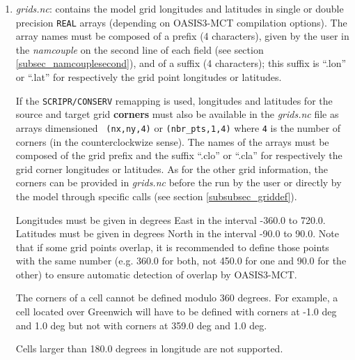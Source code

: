 \begin{enumerate}

\item {\em grids.nc}: contains the model grid
  longitudes and latitudes in single or double
  precision {\tt REAL} arrays (depending on OASIS3-MCT compilation
  options). The array names must be composed of a prefix (4
  characters), given by the user in the {\it namcouple} on the second
  line of each field (see section \ref{subsec_namcouplesecond}), and
  of a suffix (4 characters); this suffix is ``.lon'' or ``.lat'' for
  respectively the grid point longitudes or latitudes.

  If the {\tt SCRIPR/CONSERV} remapping is used, longitudes and
  latitudes for the source and target grid {\bf corners} must also be
  available in the {\em grids.nc} file as arrays dimensioned {\tt
    (nx,ny,4)} or {\tt (nbr\_pts,1,4)} where {\tt 4} is the number
  of corners (in the counterclockwize sense). The names of the arrays
  must be composed of the grid prefix and the suffix ``.clo'' or
  ``.cla'' for respectively the grid corner longitudes or latitudes.
  As for the other grid information, the corners can be provided in
  {\em grids.nc} before the run by the user or directly by the model
  through specific calls (see section \ref{subsubsec_griddef}).

 
 Longitudes must be given in degrees East in the interval -360.0 to
 720.0. Latitudes must be given in degrees North in the interval -90.0
 to 90.0. Note that if some grid points overlap, it is recommended to
 define those points with the same number (e.g. 360.0 for both, not
 450.0 for one and 90.0 for the other) to ensure automatic detection
 of overlap by OASIS3-MCT. 
 
 The corners of a cell cannot be defined modulo
 360 degrees. For example, a cell located over Greenwich will have to be defined
 with corners at -1.0 deg and 1.0 deg but not with corners at 359.0 deg and 1.0 deg.
 
 Cells larger than 180.0 degrees in longitude are not supported. 
 

\end{enumerate}
